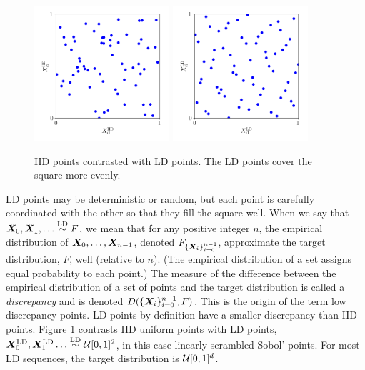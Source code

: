 \documentclass[graybox,footinfo]{svmult}
\newcommand{\LD}{\textup{LD}}
\newcommand{\LDsim}{\overset{\LD}{\sim}}
\begin{document}
\begin{figure}
	\includegraphics[height=5cm]{ags/figs/dd.iid_uniform_pts.png}%
	\qquad
	\includegraphics[height=5cm]{ags/figs/dd.sobol_pts.png}%
	\caption{IID points contrasted with LD points.  The LD points cover the square more evenly.}
	\label{fig:comparePts}
\end{figure}

LD points may be deterministic or random, but each point is carefully coordinated with the other so that they fill the square well.  When we say that $\bsX_0, \bsX_1, \ldots \LDsim F$, we mean that for any positive integer $n$,  the empirical distribution of ${\boldsymbol{X}}_0, \ldots, {\boldsymbol{X}}_{n-1}$, denoted $F_{\{{\boldsymbol{X}}_i\}_{i=0}^{n-1}}$,  approximate the target distribution, $F$, well (relative to $n$).  (The empirical distribution of a set assigns equal probability to each point.)  The measure of the difference between the empirical distribution of a set of points and the target distribution is called a \emph{discrepancy} and is denoted $D(\{{\boldsymbol{X}}_i\}_{i=0}^{n-1}, F)$.  This is the origin of the term low discrepancy points.  LD points by definition have a smaller discrepancy than IID points.  Figure \ref{fig:comparePts} contrasts IID uniform points with LD points, $\bsX^{\LD}_0, \bsX^{\LD}_1 \ldots \LDsim \calU[0,1]^2$, in this case linearly scrambled Sobol' points. For most LD sequences, the target distribution is ${\mathcal{U}}[0,1]^d$.
\end{document}
